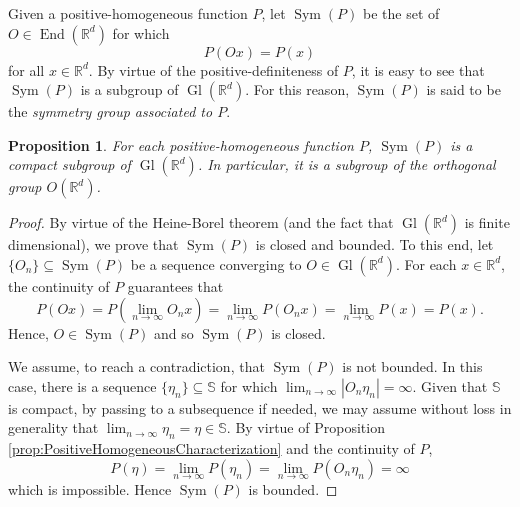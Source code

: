 \documentclass[11pt]{article}
\newtheorem{proposition}[theorem]{Proposition}
\newcommand\End{\operatorname{End}} %
\newcommand\Gl{\operatorname{Gl}} %
\newcommand\Sym{\operatorname{Sym}}
\begin{document}
\noindent Given a positive-homogeneous function $P$, let $\Sym(P)$ be the set of $O\in\End(\mathbb{R}^d)$ for which
\begin{equation*}
P(Ox)=P(x)
\end{equation*}
for all $x\in\mathbb{R}^d$. By virtue of the positive-definiteness of $P$, it is easy to see that $\Sym(P)$ is a subgroup of $\Gl(\mathbb{R}^d)$. For this reason, $\Sym(P)$ is said to be the \textit{symmetry group associated to $P$}. 

\begin{proposition}\label{prop:SymCompact}
For each positive-homogeneous function $P$, $\Sym(P)$ is a compact subgroup of $\Gl(\mathbb{R}^d)$. In particular, it is a subgroup of the orthogonal group $O(\mathbb{R}^d)$.
\end{proposition}
\begin{proof}
By virtue of the Heine-Borel theorem (and the fact that $\Gl(\mathbb{R}^d)$ is finite dimensional), we prove that $\Sym(P)$ is closed and bounded. To this end, let $\{O_n\}\subseteq\Sym(P)$ be a sequence converging to $O\in \Gl(\mathbb{R}^d)$. For each $x\in\mathbb{R}^d$, the continuity of $P$ guarantees that
\begin{equation*}
P(Ox)=P\left(\lim_{n\to\infty}O_nx\right)=\lim_{n\to\infty}P(O_nx)=\lim_{n\to\infty}P(x)=P(x).
\end{equation*}
Hence, $O\in\Sym(P)$ and so $\Sym(P)$ is closed.

We assume, to reach a contradiction, that $\Sym(P)$ is not bounded. In this case, there is a sequence $\{\eta_n\}\subseteq \mathbb{S}$ for which $\lim_{n\to\infty}|O_n\eta_n|=\infty$. Given that $\mathbb{S}$ is compact, by passing to a subsequence if needed, we may assume without loss in generality that $\lim_{n\to\infty}\eta_n=\eta\in\mathbb{S}$. By virtue of Proposition \ref{prop:PositiveHomogeneousCharacterization} and the continuity of $P$,
\begin{equation*}
P(\eta)=\lim_{n\to\infty}P(\eta_n)=\lim_{n\to\infty}P(O_n\eta_n)=\infty
\end{equation*}
which is impossible. Hence $\Sym(P)$ is bounded.
\end{proof}
\end{document}
